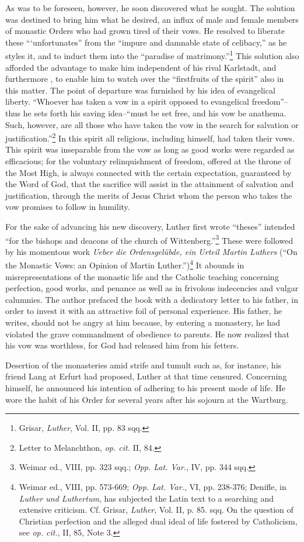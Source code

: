 As was to be foreseen, however, he soon discovered what he sought.
The solution was destined to bring him what he desired, an influx of
male and female members of monastic Orders who had grown tired of
their vows. He resolved to liberate these “‘unfortunates” from the
“impure and damnable state of celibacy,” as he styles it, and to induct
them into the “paradise of matrimony.”\footnote{Grisar, \textit{Luther}, Vol. II, pp. 83 sqq.}
This solution also afforded
the advantage to make him independent of his rival Karlstadt, and furthermore
, to enable him to watch over the “firstfruits of the spirit”
also in this matter. The point of departure was furnished by his idea
of evangelical liberty. “Whoever has taken a vow in a spirit opposed
to evangelical freedom”--thus he sets forth his saving idea--“must
be set free, and his vow be anathema. Such, however, are all those
who have taken the vow in the search for salvation or justification.”\footnote{Letter to Melanchthon, \textit{op. cit.} II, 84.}
In this spirit all religious, including himself, had taken their
vows. This spirit was inseparable from the vow as long as good works
were regarded as efficacious; for the voluntary relinquishment of
freedom, offered at the throne of the Most High, is always connected
with the certain expectation, guaranteed by the Word of God, that
the sacrifice will assist in the attainment of salvation and justification,
through the merits of Jesus Christ whom the person who takes the
vow promises to follow in humility.

For the sake of advancing his new discovery, Luther first wrote
“theses” intended “for the bishops and deacons of the church of
Wittenberg.”\footnote{Weimar ed., VIII, pp. 323 sqq.; \textit{Opp. Lat. Var.}, IV, pp. 344 sqq.}
These were followed by his momentous work \textit{Ueber die
Ordensgelübde, ein Urteil Martin Luthers} (“On the Monastic
Vows: an Opinion of Martin Luther.”)\footnote
{Weimar ed., VIII, pp. 573-669; \textit{Opp. Lat. Var.}, VI, pp. 238-376; Denifle, in \textit{Luther
und Luthertum}, has subjected the Latin text to a searching and extensive criticism. Cf.
Grisar, \textit{Luther}, Vol. II, p. 85. sqq. On the question of Christian perfection and the alleged
dual ideal of life fostered by Catholicism, see \textit{op. cit.}, II, 85, Note 3.}
It abounds in misrepresentations
of the monastic life and the Catholic teaching concerning
perfection, good works, and penance as well as in frivolous indecencies
and vulgar calumnies. The author prefaced the book with a dedicatory
letter to his father, in order to invest it with an attractive foil of
personal experience. His father, he writes, should not be angry at him
because, by entering a monastery, he had violated the grave commandment
of obedience to parents. He now realized that his vow was
worthless, for God had released him from his fetters.

Desertion of the monasteries amid strife and tumult such as, for
instance, his friend Lang at Erfurt had proposed, Luther at that time
censured. Concerning himself, he announced his intention of adhering to
his present mode of life. He wore the habit of his Order for
several years after his sojourn at the Wartburg.
